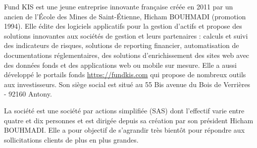 Fund KIS est une jeune entreprise innovante française créée en 2011 par un ancien de l'\'Ecole des Mines de Saint-\'Etienne, Hicham BOUHMADI (promotion 1994). Elle édite des logiciels applicatifs pour la gestion d'actifs et propose des solutions innovantes aux sociétés de gestion et leurs partenaires : calculs et suivi des indicateurs de risques, solutions de reporting financier, automatisation de documentations réglementaires, des solutions d'enrichissement des sites web avec des données fonds et des applications web ou mobile sur mesure. Elle a aussi développé le portails fonds \url{https://fundkis.com} qui propose de nombreux outils aux investisseurs. Son siège social est situé au 55 Bis avenue du Bois de Verrières - 92160 Antony.

\vspace{3mm}

La société est une société par actions simplifiée (SAS) dont l'effectif varie entre quatre et dix personnes et est dirigée depuis sa création par son président Hicham BOUHMADI. Elle a pour objectif de s'agrandir très bientôt pour répondre aux sollicitations clients de plus en plus grandes.
